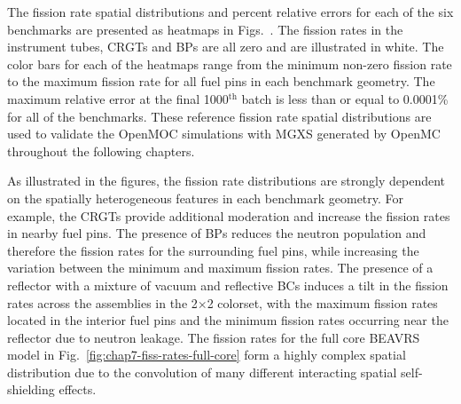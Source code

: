The fission rate spatial distributions and percent relative errors for each of the six benchmarks are presented as heatmaps in Figs.~. The fission rates in the instrument tubes, \acp{CRGT} and \acp{BP} are all zero and are illustrated in white. The color bars for each of the heatmaps range from the minimum non-zero fission rate to the maximum fission rate for all fuel pins in each benchmark geometry. The maximum relative error at the final 1000$^{\text{th}}$ batch is less than or equal to 0.0001\% for all of the benchmarks. These reference fission rate spatial distributions are used to validate the OpenMOC simulations with \ac{MGXS} generated by OpenMC throughout the following chapters.


As illustrated in the figures, the fission rate distributions are strongly dependent on the spatially heterogeneous features in each benchmark geometry. For example, the \acp{CRGT} provide additional moderation and increase the fission rates in nearby fuel pins. The presence of \acp{BP} reduces the neutron population and therefore the fission rates for the surrounding fuel pins, while increasing the variation between the minimum and maximum fission rates. The presence of a reflector with a mixture of vacuum and reflective \acp{BC} induces a tilt in the fission rates across the assemblies in the 2$\times$2 colorset, with the maximum fission rates located in the interior fuel pins and the minimum fission rates occurring near the reflector due to neutron leakage. The fission rates for the full core \ac{BEAVRS} model in Fig.~\ref{fig:chap7-fiss-rates-full-core} form a highly complex spatial distribution due to the convolution of many different interacting spatial self-shielding effects.

